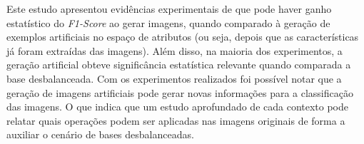 Este estudo apresentou evidências experimentais de que pode haver ganho estatístico do \textit{F1-Score} ao gerar imagens, quando comparado à geração de exemplos artificiais no espaço de atributos (ou seja, depois que as características já foram extraídas das imagens). Além disso, na maioria dos experimentos, a geração artificial obteve significância estatística relevante quando comparada a base desbalanceada. Com os experimentos realizados foi possível notar que a geração de imagens artificiais pode gerar novas informações para a classificação das imagens. O que indica que um estudo aprofundado de cada contexto pode relatar quais operações podem ser aplicadas nas imagens originais de forma a auxiliar o cenário de bases desbalanceadas.
